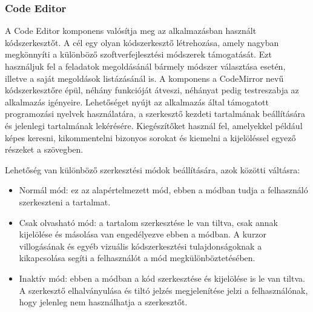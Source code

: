 \documentclass{elteikthesis}
\begin{document}
				\subsubsection{Code Editor}
				A Code Editor komponens valósítja meg az alkalmazásban használt kódszerkesztőt. A cél egy olyan kódszerkesztő létrehozása, amely nagyban megkönnyíti a különböző szoftverfejlesztési módszerek támogatását. Ezt használjuk fel a feladatok megoldásánál bármely módszer választása esetén, illetve a saját megoldások listázásánál is. A komponens a CodeMirror nevű kódszerkesztőre épül, néhány funkcióját átveszi, néhányat pedig testreszabja az alkalmazás igényeire. Lehetőséget nyújt az alkalmazás által támogatott programozási nyelvek használatára, a szerkesztő kezdeti tartalmának beállítására és jelenlegi tartalmának lekérésére. Kiegészítőket használ fel, amelyekkel például képes keresni, kikommentelni bizonyos sorokat és kiemelni a kijelöléssel egyező részeket a szövegben.
				
				Lehetőség van különböző szerkesztési módok beállítására, azok közötti váltásra:
				\begin{itemize}
					\item Normál mód: ez az alapértelmezett mód, ebben a módban tudja a felhasználó szerkeszteni a tartalmat.
					\item Csak olvasható mód: a tartalom szerkesztése le van tiltva, csak annak kijelölése és másolása van engedélyezve ebben a módban. A kurzor villogásának és egyéb vizuális kódszerkesztési tulajdonságoknak a kikapcsolása segíti a felhasználót a mód megkülönböztetésében.
					\item Inaktív mód: ebben a módban a kód szerkesztése és kijelölése is le van tiltva. A szerkesztő elhalványulása és tiltó jelzés megjelenítése jelzi a felhasználónak, hogy jelenleg nem használhatja a szerkesztőt.
				\end{itemize}
\end{document}
